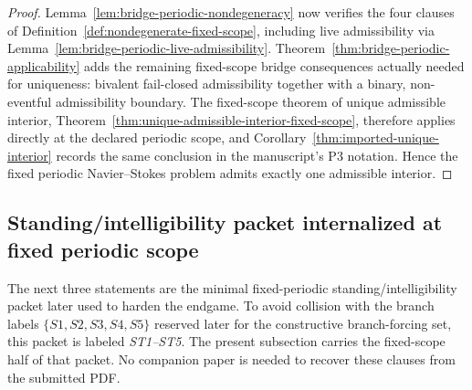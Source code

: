 \begin{proof}
Lemma~\ref{lem:bridge-periodic-nondegeneracy} now verifies the four clauses of Definition~\ref{def:nondegenerate-fixed-scope}, including live admissibility via Lemma~\ref{lem:bridge-periodic-live-admissibility}. Theorem~\ref{thm:bridge-periodic-applicability} adds the remaining fixed-scope bridge consequences actually needed for uniqueness: bivalent fail-closed admissibility together with a binary, non-eventful admissibility boundary. The fixed-scope theorem of unique admissible interior, Theorem~\ref{thm:unique-admissible-interior-fixed-scope}, therefore applies directly at the declared periodic scope, and Corollary~\ref{thm:imported-unique-interior} records the same conclusion in the manuscript's P3 notation. Hence the fixed periodic Navier--Stokes problem admits exactly one admissible interior.
\end{proof}


\subsection{Standing/intelligibility packet internalized at fixed periodic scope}
\label{subsec:standing-intelligibility-packet}
The next three statements are the minimal fixed-periodic standing/intelligibility packet later used to harden the endgame. To avoid collision with the branch labels $\{S1,S2,S3,S4,S5\}$ reserved later for the constructive branch-forcing set, this packet is labeled \emph{ST1--ST5}. The present subsection carries the fixed-scope half of that packet. No companion paper is needed to recover these clauses from the submitted PDF.

